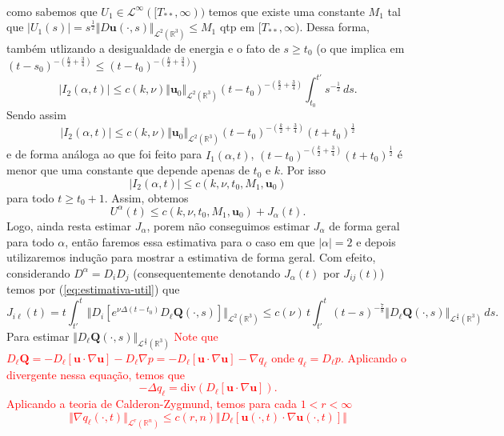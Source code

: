 \documentclass[a4paper, 11pt]{book}
\theoremstyle{definition}
\newcommand{\bR}{\mathbb{R}}
\newcommand{\bu}{\mathbf{u}}
\newcommand{\BQ}{\mathbf{Q}}
\newcommand{\cL}{\mathcal{L}}
\begin{document}
\begin{prf}
\[\begin{aligned}
        \end{aligned}
    \]
    como sabemos que $U_1 \in \cL^\infty([T_{**},\infty))$ temos que existe uma constante $M_1$ tal que $|U_1(s)| = s^{\frac{1}{2}} \Vert D\bu(\cdot,s) \Vert_{\cL^2(\bR^3)} \leqslant M_1$ qtp em $[T_{**},\infty)$.
    Dessa forma, também utlizando a desigualdade de energia e o fato de $s \geqslant t_0$ (o que implica em $(t-s_0)^{-\left( \frac{k}{2} + \frac{3}{4} \right)} \leqslant (t-t_0)^{-\left( \frac{k}{2} + \frac{3}{4} \right)}$)
    \[
        |I_2(\alpha,t)|\leqslant c(k,\nu) \Vert \bu_0 \Vert_{\cL^2(\bR^3)} (t-t_0)^{-\left( \frac{k}{2} + \frac{3}{4} \right)} \int_{t_0}^{t'} s^{-\frac{1}{2}} \,ds.
    \]
    Sendo assim
    \[
        |I_2(\alpha,t)|\leqslant c(k,\nu) \Vert \bu_0 \Vert_{\cL^2(\bR^3)} (t-t_0)^{-\left( \frac{k}{2} + \frac{3}{4} \right)} (t + t_0)^{\frac{1}{2}}
    \]
    e de forma análoga ao que foi feito para $I_1(\alpha,t)$, $(t-t_0)^{-\left( \frac{k}{2} + \frac{3}{4} \right)} (t + t_0)^{\frac{1}{2}}$ é menor que uma constante que depende apenas de $t_0$ e $k$. Por isso
    \[
        |I_2(\alpha,t)|\leqslant c(k,\nu, t_0, M_1, \bu_0)
    \]
    para todo $t \geqslant t_0 + 1$.
    Assim, obtemos
    \begin{equation} \label{eq:4.10}
        U^\alpha(t) \leqslant c(k,\nu,t_0,M_1,\bu_0) + J_\alpha(t).
    \end{equation}
    Logo, ainda resta estimar $J_\alpha$, porem não conseguimos estimar $J_\alpha$ de forma geral para todo $\alpha$, então faremos essa estimativa para o caso em que $|\alpha| = 2$ e depois utilizaremos indução para mostrar a estimativa de forma geral.
    Com efeito, considerando $D^\alpha = D_iD_j$ (consequentemente denotando $J_\alpha(t)$ por $J_{ij}(t)$) temos por (\ref{eq:estimativa-util}) que
    \[
        J_{i\ell}(t) = t\int_{t'}^t \Vert D_i [ e^{\nu \Delta (t-t_0)} D_\ell \BQ (\cdot,s) ] \Vert_{\cL^2(\bR^3)} \leqslant c(\nu) \, t \int_{t'}^t (t - s)^{-\frac{7}{8}} \Vert D_\ell \BQ(\cdot,s) \Vert_{\cL^{\frac{4}{3}}(\bR^3)} \,ds.
    \]
    Para estimar $\Vert D_\ell \BQ(\cdot,s) \Vert_{\cL^{\frac{4}{3}}(\bR^3)}$
    \textcolor{red}{
        Note que $D_\ell\BQ = - D_\ell [ \bu \cdot \nabla \bu] - D_\ell \nabla p = - D_\ell [\bu \cdot \nabla \bu] - \nabla q_\ell$ onde $q_\ell = D_\ell p$. Aplicando o divergente nessa equação, temos que
        \[
            -\Delta q_\ell = \mathrm{div} ( D_\ell [ \bu \cdot \nabla \bu]).
        \]
        Aplicando a teoria de Calderon-Zygmund, temos para cada $1 < r < \infty$
        \[
            \Vert \nabla q_\ell (\cdot,t) \Vert_{\cL^r(\bR^n)} \leqslant c(r,n) \Vert D_{\ell} [\bu(\cdot,t) \cdot \nabla\bu (\cdot,t) ] \Vert
\]}
\end{prf}
\end{document}

